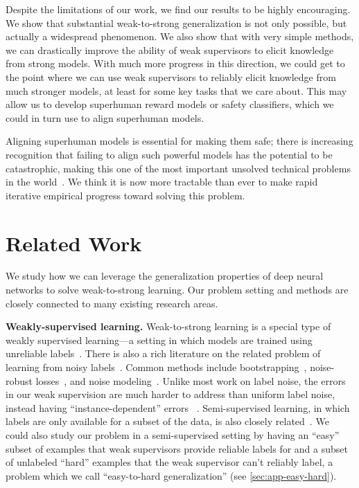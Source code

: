 Despite the limitations of our work, we find our results to be highly encouraging. We show that substantial weak-to-strong generalization is not only possible, but actually a widespread phenomenon. We also show that with very simple methods, we can drastically improve the ability of weak supervisors to elicit knowledge from strong models. With much more progress in this direction, we could get to the point where we can use weak supervisors to reliably elicit knowledge from much stronger models, at least for some key tasks that we care about. This may allow us to develop superhuman reward models or safety classifiers, which we could in turn use to align superhuman models.

Aligning superhuman models is essential for making them safe; there is increasing recognition that failing to align such powerful models has the potential to be catastrophic, making this one of the most important unsolved technical problems in the world~\citep{ai-risk-open-letter}. We think it is now more tractable than ever to make rapid iterative empirical progress toward solving this problem.

\section{Related Work}

We study how we can leverage the generalization properties of deep neural networks to solve weak-to-strong learning. Our problem setting and methods are closely connected to many existing research areas.

\textbf{Weakly-supervised learning.}\quad 
Weak-to-strong learning is a special type of weakly supervised learning---a setting in which models are trained using unreliable labels~\citep{bach2017learning, ratner2017snorkel, Guo_2018_ECCV}. There is also a rich literature on the related problem of learning from noisy labels~\citep{song2022learning}. Common methods include bootstrapping~\citep{reed2014training, han2018co, li2020dividemix}, noise-robust losses~\citep{zhang2018generalized, hendrycks2018using,ma2020normalized}, and noise modeling~\citep{Yi_2019_CVPR}. Unlike most work on label noise, the errors in our weak supervision are much harder to address than uniform label noise, instead having ``instance-dependent'' errors ~\citep{frenay2013classification}. Semi-supervised learning, in which labels are only available for a subset of the data, is also closely related~\citep{kingma2014semi, laine2016temporal, berthelot2019mixmatch}. We could also study our problem in a semi-supervised setting by having an ``easy'' subset of examples that weak supervisors provide reliable labels for and a subset of unlabeled ``hard'' examples that the weak supervisor can't reliably label, a problem which we call ``easy-to-hard generalization'' (see \ref{sec:app-easy-hard}).

